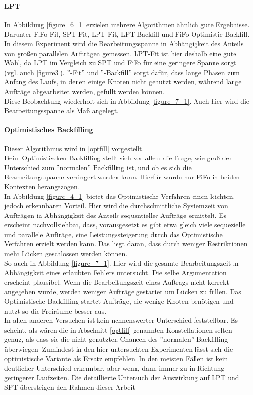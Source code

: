 \paragraph{LPT}
In Abbildung \ref{figure_6_1} erzielen mehrere Algorithmen ähnlich  gute Ergebnisse. Darunter FiFo-Fit, SPT-Fit, LPT-Fit, LPT-Backfill und FiFo-Optimistic-Backfill. In diesem Experiment wird die Bearbeitungsspanne in Abhängigkeit des Anteils von großen parallelen Aufträgen gemessen. LPT-Fit ist hier deshalb eine gute Wahl, da LPT im Vergleich zu SPT und FiFo für eine geringere Spanne sorgt (vgl. auch \ref{figure3}). ''-Fit'' und ''-Backfill'' sorgt dafür, dass lange Phasen zum Anfang des Laufs, in denen einige Knoten nicht genutzt werden, während lange Aufträge abgearbeitet werden, gefüllt werden können.\\
Diese Beobachtung wiederholt sich in Abbildung \ref{figure_7_1}. Auch hier wird die Bearbeitungsspanne als Maß angelegt.\\


\paragraph{Optimistisches Backfilling}
Dieser Algorithmus wird in \ref{optfill} vorgestellt.\\
Beim Optimistischen Backfilling stellt sich vor allem die Frage, wie groß der Unterschied zum ''normalen'' Backfilling ist, und ob es sich die Bearbeitungsspanne verringert werden kann. Hierfür wurde nur FiFo in beiden Kontexten herangezogen.\\
In Abbildung \ref{figure_4_1} bietet das Optimistische Verfahren einen leichten, jedoch erkennbaren Vorteil. Hier wird die durchschnittliche Systemzeit von Aufträgen in Abhängigkeit des Anteils sequentieller Aufträge ermittelt. Es erscheint nachvollziehbar, dass, vorausgesetzt es gibt etwa gleich viele sequezielle und parallele Aufträge, eine Leistungssteigerung durch das Optimistische Verfahren erzielt werden kann. Das liegt daran, dass durch weniger Restriktionen mehr Lücken geschlossen werden können.\\
So auch in Abbildung \ref{figure_7_1}. Hier wird die gesamte Bearbeitungszeit in Abhängigkeit eines erlaubten Fehlers untersucht. Die selbe Argumentation erscheint plausibel. Wenn die Bearbeitungszeit eines Auftrags nicht korrekt angegeben wurde, werden weniger Aufträge gestartet um Lücken zu füllen. Das Optimistische Backfilling startet Aufträge, die wenige Knoten benötigen und nutzt so die Freiräume besser aus.\\
In allen anderen Versuchen ist kein nennenswerter Unterschied feststellbar. Es scheint, als wären die in Abschnitt \ref{optfill} genannten Konstellationen selten genug, als dass sie die nicht genutzten Chancen des ''normalen'' Backfilling überwiegen. Zumindest in den hier untersuchten Experimenten lässt sich die optimistische Variante als Ersatz empfehlen. In den meisten Fällen ist kein deutlicher Unterschied erkennbar, aber wenn, dann immer zu in Richtung geringerer Laufzeiten. Die detaillierte Untersuch der Auswirkung auf LPT und SPT übersteigen den Rahmen dieser Arbeit. 

